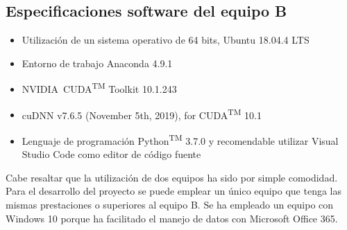 \subsection{Especificaciones software del equipo B}
\label{subsec:especificaciones-software-equipob}
\begin{itemize}
    \item Utilización de un sistema operativo de 64 bits, Ubuntu 18.04.4 LTS
    \item Entorno de trabajo Anaconda 4.9.1
    \item NVIDIA\textregistered\ CUDA\textsuperscript{TM} Toolkit 10.1.243 
    \item cuDNN v7.6.5 (November 5th, 2019), for CUDA\textsuperscript{TM} 10.1
    \item Lenguaje de programación Python\textsuperscript{TM} 3.7.0 y recomendable utilizar Visual Studio Code como editor de código fuente
\end{itemize}

Cabe resaltar que la utilización de dos equipos ha sido por simple comodidad. Para el desarrollo del proyecto se puede emplear un único equipo que tenga las mismas prestaciones o superiores al equipo B. Se ha empleado un equipo con Windows 10 porque ha facilitado el manejo de datos con Microsoft Office 365.